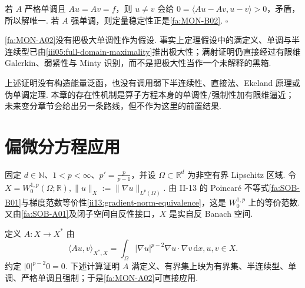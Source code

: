 \begin{FAProof}
若 \(\displaystyle A\) 严格单调且 \(\displaystyle Au=Av=f\)，则 \(\displaystyle u\neq v\) 会给 \(\displaystyle0=\langle Au-Av,u-v\rangle>0\)，矛盾，所以解唯一. 若 \(\displaystyle A\) 强单调，则定量稳定性正是\autoref{fa:MON-B02}.
\hfill\(\square\)
\end{FAProof}

\begin{FARemark}[极大性不是额外假设]
\autoref{fa:MON-A02}没有把极大单调性作为假设. 事实上定理假设中的满定义、单调与半连续型已由\autoref{iii05:full-domain-maximality}推出极大性；满射证明仍直接经过有限维 Galerkin、弱紧性与 Minty 识别，而不是把极大性当作一个未解释的黑箱.
\end{FARemark}

\begin{FARemark}[非变分路线]
上述证明没有构造能量泛函，也没有调用弱下半连续性、直接法、Ekeland 原理或伪单调定理. 本章的存在性机制是算子方程本身的单调性/强制性加有限维逼近；未来变分章节会给出另一条路线，但不作为这里的前置结果.
\end{FARemark}

\section{偏微分方程应用}\label{sec:iii05-pde}

\begin{FAApplication}
固定 \(\displaystyle d\in\mathbb N\)、\(\displaystyle1<p<\infty\)、\(\displaystyle p'=\frac{p}{p-1}\)，并设 \(\displaystyle\Omega\subset\mathbb R^d\) 为非空有界 Lipschitz 区域. 令
\(\displaystyle X=W_0^{1,p}(\Omega;\mathbb R), \|u\|_X := \|\nabla u\|_{L^p(\Omega)}.\)
由 II-13 的 Poincaré 不等式\autoref{fa:SOB-B01}与梯度范数等价性\autoref{ii13:gradient-norm-equivalence}，这是 \(\displaystyle W_0^{1,p}\) 上的等价范数. 又由\autoref{fa:SOB-A01}及闭子空间自反性接口，\(\displaystyle X\) 是实自反 Banach 空间.

定义 \(\displaystyle A:X\to X^*\) 由
\[
\langle Au,v\rangle_{X^*,X}
=
\int_\Omega
|\nabla u|^{p-2}\nabla u\cdot\nabla v
\,\mathrm{d}x,
u,v\in X.
\]
约定 \(\displaystyle|0|^{p-2}0=0\). 下述计算证明 \(\displaystyle A\) 满定义、有界集上映为有界集、半连续型、单调、严格单调且强制；于是\autoref{fa:MON-A02}可直接应用.
\end{FAApplication}

